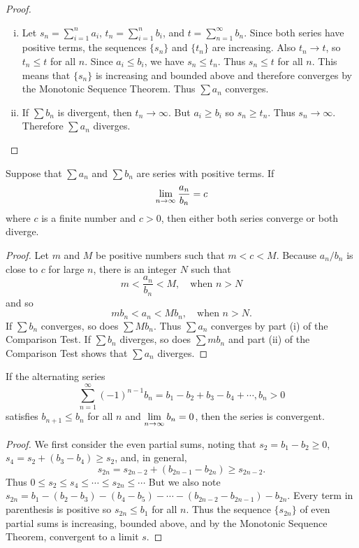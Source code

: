 \documentclass[a4paper,8pt]{article}
\begin{document}
\begin{outline}
    \begin{proof}
      \begin{enumerate}[i.]
        \item
          Let \(s_n = \sum_{i=1}^n a_i\), \(t_n = \sum_{i=1}^n b_i\), and \(t = \sum_{n=1}^{\infty} b_n\).
          Since both series have positive terms, the sequences \(\{s_n\}\) and \(\{t_n\}\) are increasing. Also \(t_n \rightarrow t\),
          so \(t_n \leq t\) for all \(n\). Since \(a_i \leq b_i\), we have \(s_n \leq t_n\). Thus \(s_n \leq t\) for all \(n\). This
          means that \(\{s_n\}\) is increasing and bounded above and therefore converges by the Monotonic Sequence Theorem. Thus
          \(\sum a_n\) converges.
        \item
          If \(\sum b_n\) is divergent, then \(t_n \rightarrow \infty\). But \(a_i \geq b_i\) so \(s_n \geq t_n\). Thus
          \(s_n \rightarrow \infty\). Therefore \(\sum a_n\) diverges.
      \end{enumerate}
    \end{proof}

    Suppose that \(\sum a_n\) and \(\sum b_n\) are series with positive terms. If
    \[ \lim\limits_{n\rightarrow \infty^{}} \frac{a_n}{b_n} = c \] where \(c\) is a finite number and \(c > 0\), then either both
    series converge or both diverge.

    \begin{proof}
      Let \(m\) and \(M\) be positive numbers such that \(m < c < M\). Because \(a_n/b_n\) is close to \(c\) for large \(n\),
      there is an integer \(N\) such that \[ m < \frac{a_n}{b_n} < M,\quad \text{when }n > N \] and so
      \[ mb_n < a_n < Mb_n,\quad \text{when }n > N\text{.} \] If \(\sum b_n\) converges, so does \(\sum Mb_n\). Thus \(\sum a_n\)
      converges by part (i) of the Comparison Test. If \(\sum b_n\) diverges, so does \(\sum mb_n\) and part (ii) of the Comparison
      Test shows that \(\sum a_n\) diverges.
    \end{proof}

    If the alternating series \[ \sum_{n=1}^{\infty} (-1)^{n-1} b_n = b_1 - b_2 + b_3 - b_4 + \cdots, b_n > 0 \] satisfies
    \(b_{n+1} \leq b_n\) for all \(n\) and \(\lim\limits_{n\rightarrow \infty^{}}b_n = 0\), then the series is convergent.

    \begin{proof}
      We first consider the even partial sums, noting that \(s_2 = b_1 - b_2 \geq 0\), \(s_4 = s_2 + (b_3 - b_4) \geq s_2\), and, in general,
      \[ s_{2n} = s_{2n-2} + (b_{2n-1} - b_{2n}) \geq s_{2n-2}\text{.} \] Thus \( 0 \leq s_2 \leq s_4 \leq \cdots \leq s_{2n} \leq \cdots\)
      But we also note \(s_{2n} = b_1 - (b_2 - b_3) - (b_4 - b_5) - \cdots - (b_{2n-2} - b_{2n-1}) - b_{2n}\).
      Every term in parenthesis is positive so \(s_{2n} \leq b_1\) for all \(n\). Thus the sequence \(\{s_{2n}\}\) of even partial sums
      is increasing, bounded above, and by the Monotonic Sequence Theorem, convergent to a limit \(s\).


\end{proof}
\end{outline}
\end{document}
